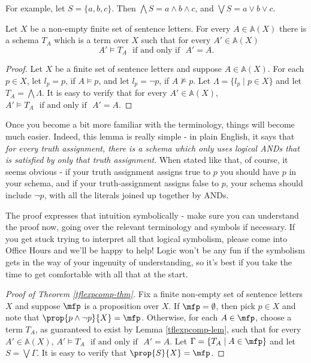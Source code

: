 \begin{aside}
    For example, let $S = \{a, b, c\}$. Then $\bigwedge S = a \land b \land c$, and $\bigvee S = a \vee b \vee c$.
\end{aside}

\begin{lemma}\label{tflexpcomp-lem}
Let $X$ be a non-empty finite set of sentence letters. For every $A\in\mathbb{A}(X)$ there is a schema $T_A$ which is a term over $X$ such that for every $A'\in\mathbb{A}(X)$
\[A'\models T_A\ \ \ \mbox{if and only if}\ \ \ A'=A.\]
\end{lemma}
\begin{proof}
Let $X$ be a finite set of sentence letters and suppose $A\in\mathbb{A}(X)$. For each $p\in X$, let $l_p = p$, if $A\models p$, and let $l_p = \neg p$, if $A\not\models p$. Let $\Lambda=\{l_p\mid p\in X\}$ and let $T_A = \bigwedge\Lambda$. It is easy to verify that
for every $A'\in\mathbb{A}(X)$, 
$A'\models T_A\ \ \ \mbox{if and only if}\ \ \ A'=A$. 
\end{proof}    

\begin{aside}
    Once you become a bit more familiar with the terminology, things will become much easier. Indeed, this lemma is really simple - in plain English, it says that \emph{for every truth assignment, there is a schema which only uses logical ANDs that is satisfied by only that truth assignment}. When stated like that, of course, it seems obvious - if your truth assignment assigns true to $p$ you should have $p$ in your schema, and if your truth-assignment assigns false to $p$, your schema should include $\lnot p$, with all the literals joined up together by ANDs. 

    The proof expresses that intuition symbolically - make sure you can understand the proof now, going over the relevant terminology and symbols if necessary. If you get stuck trying to interpret all that logical symbolism, please come into Office Hours and we'll be happy to help! Logic won't be any fun if the symbolism gets in the way of your ingenuity of understanding, so it's best if you take the time to get comfortable with all that at the start. 
\end{aside}

\begin{proof}[Proof of Theorem \ref{tflexpcomp-thm}]
Fix a finite non-empty set of sentence letters $X$ and suppose $\mfp$ is a proposition over $X$. If $\mfp=\emptyset$, then pick $p\in X$ and note that $\prop{p\wedge\neg p}{X} = \mfp$. Otherwise, for each $A\in\mfp$, choose a term $T_A$, as guaranteed to exist by Lemma \ref{tflexpcomp-lem}, such that for every $A'\in\mathbb{A}(X)$, 
$A'\models T_A\ \ \ \mbox{if and only if}\ \ \ A'=A$. Let $\Gamma = \{T_A\mid A\in\mfp\}$ and let $S=\bigvee\Gamma$. It is easy to verify that $\prop{S}{X}=\mfp$.
\end{proof}

